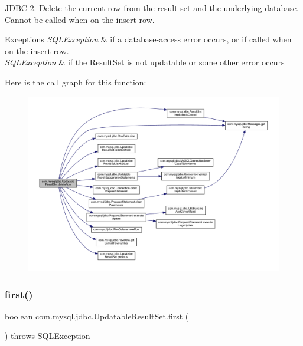 J\+D\+BC 2. Delete the current row from the result set and the underlying database. Cannot be called when on the insert row.


\begin{DoxyExceptions}{Exceptions}
{\em S\+Q\+L\+Exception} & if a database-\/access error occurs, or if called when on the insert row. \\
\hline
{\em S\+Q\+L\+Exception} & if the Result\+Set is not updatable or some other error occurs \\
\hline
\end{DoxyExceptions}
Here is the call graph for this function\+:
\nopagebreak
\begin{figure}[H]
\begin{center}
\leavevmode
\includegraphics[width=350pt]{classcom_1_1mysql_1_1jdbc_1_1_updatable_result_set_a921d48d8e5c7adfde7518475024d822f_cgraph}
\end{center}
\end{figure}
\mbox{\label{classcom_1_1mysql_1_1jdbc_1_1_updatable_result_set_a190d77a54225de646c3dbe21fc936b16}} 
\subsubsection{\texorpdfstring{first()}{first()}}
{\footnotesize\ttfamily boolean com.\+mysql.\+jdbc.\+Updatable\+Result\+Set.\+first (\begin{DoxyParamCaption}{ }\end{DoxyParamCaption}) throws S\+Q\+L\+Exception}

